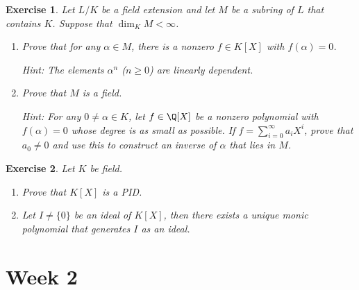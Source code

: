 \documentclass[a4paper,10pt,reqno]{amsart}
\newtheorem{ex}{Exercise}[section]
\begin{document}
\begin{ex}
\label{1.6}
    Let $L/K$ be a field extension and let $M$ be a subring of $L$ that contains $K$. Suppose that $\dim_KM < \infty$.
    \begin{enumerate}[label=(\roman*)]
        \item Prove that for any $\alpha \in M$, there is a nonzero $f \in K[X]$ with $f(\alpha) = 0$.

        \noindent \textit{Hint:} The elements $\alpha^n$ ($n \geq 0$) are linearly dependent.
        
        \item Prove that $M$ is a field.
        
        \noindent \textit{Hint:} For any $0 \neq \alpha \in K$, let $f \in \Q[X]$ be a nonzero polynomial with $f(\alpha) = 0$ whose degree is as small as possible. If $f = \sum_{i=0}^{\infty} a_iX^i$, prove that $a_0 \neq 0$ and use this to construct an inverse of $\alpha$ that lies in $M$.
    \end{enumerate}
\end{ex}

\begin{ex}
\label{1.7}
Let $K$ be field.
\begin{enumerate}[label=(\roman*)]
    \item Prove that $K[X]$ is a PID.
    \item Let $I\neq \{0\}$ be an ideal of $K[X]$, then there exists a unique monic polynomial that generates $I$ as an ideal.
\end{enumerate}
    
\end{ex}
\newpage
\section{Week 2}
\end{document}
